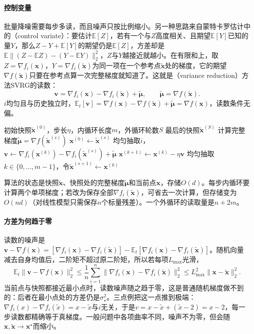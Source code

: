 \paragraph{控制变量}
批量降噪需要每步多读，而且噪声只按比例缩小。另一种思路来自蒙特卡罗估计中的（control variate）：要估计$\mathbb E[Z]$，若有一个与$Z$高度相关、且期望$\mathbb E[Y]$已知的量$Y$，那么$Z-Y+\mathbb E[Y]$的期望仍是$\mathbb E[Z]$，方差却是$\mathbb E\lVert(Z-\mathbb EZ)-(Y-\mathbb EY)\rVert_2^2$，$Z$与$Y$越接近就越小。在有限和上，取$Z=\nabla f_i(\bm x)$，$Y=\nabla f_i(\tilde{\bm x})$为同一项在一个参考点$\tilde{\bm x}$处的梯度，它的期望$\nabla f(\tilde{\bm x})$只要在参考点算一次完整梯度就知道了。这就是（variance reduction）方法SVRG的读数：
\begin{equation}
\label{eq:opt-sto-svrg}
  \bm v=\nabla f_i(\bm x)-\nabla f_i(\tilde{\bm x})+\tilde{\bm\mu},\qquad\tilde{\bm\mu}=\nabla f(\tilde{\bm x}).
\end{equation}
$i$均匀且与历史独立时，$\mathbb E_t[\bm v]=\nabla f(\bm x)-\nabla f(\tilde{\bm x})+\tilde{\bm\mu}=\nabla f(\bm x)$，读数条件无偏。

\begin{algorithm}[SVRG]
\label{alg:opt-sto-svrg}
\begin{algorithmic}[1]
\Require 初始快照$\tilde{\bm x}^{(0)}$，步长$\eta$，内循环长度$m$，外循环轮数$S$
\Ensure 最后的快照$\tilde{\bm x}^{(S)}$
  \State 计算完整梯度$\tilde{\bm\mu}=\nabla f(\tilde{\bm x}^{(s)})$ 
  \State $\bm x^{(0)}\gets\tilde{\bm x}^{(s)}$
    \State 均匀抽取$i$，$\bm v\gets\nabla f_i(\bm x^{(k)})-\nabla f_i(\tilde{\bm x}^{(s)})+\tilde{\bm\mu}$
    \State $\bm x^{(k+1)}\gets\bm x^{(k)}-\eta\bm v$
  \EndFor
  \State 均匀抽取$k\in\{0,\dots,m-1\}$，令$\tilde{\bm x}^{(s+1)}\gets\bm x^{(k)}$ 
\EndFor
\end{algorithmic}
\end{algorithm}

算法的状态是快照$\tilde{\bm x}$、快照处的完整梯度$\tilde{\bm\mu}$和当前点$\bm x$，存储$O(d)$。每步内循环要计算两个单项梯度；若改为保存全部$\nabla f_i(\tilde{\bm x})$，可省去一次计算，但存储变为$O(nd)$（对线性模型只需保存$n$个标量残差）。一个外循环的读取量是$n+2m$。

\paragraph{方差为何趋于零}
读数的噪声是$\bm v-\nabla f(\bm x)=[\nabla f_i(\bm x)-\nabla f_i(\tilde{\bm x})]-\mathbb E_t[\nabla f_i(\bm x)-\nabla f_i(\tilde{\bm x})]$。随机向量减去自身均值后，二阶矩不超过原二阶矩，所以若每项$L_{\max}$光滑，
\[
  \mathbb E_t\lVert\bm v-\nabla f(\bm x)\rVert_2^2\leq\frac1n\sum_{i=1}^n\lVert\nabla f_i(\bm x)-\nabla f_i(\tilde{\bm x})\rVert_2^2\leq L_{\max}^2\lVert\bm x-\tilde{\bm x}\rVert_2^2 .
\]
当前点与快照都接近最小点时，读数噪声随之趋于零，这是普通随机梯度做不到的：后者在最小点处的方差仍是$\sigma_\star^2$。三点例把这一点推到极端：$\nabla f_i(x)-\nabla f_i(\tilde x)=x-\tilde x$与$i$无关，于是$v=x-\tilde x+(\tilde x-2)=x-2$，每一步读数都精确等于真梯度。一般问题中各项曲率不同，噪声不为零，但会随$\bm x,\tilde{\bm x}\to\bm x^\star$而缩小。


